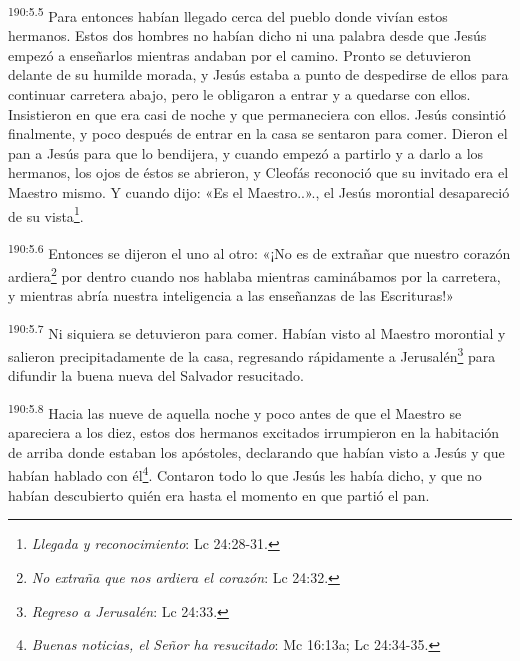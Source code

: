 \par
\textsuperscript{190:5.5} Para entonces habían llegado cerca del pueblo donde vivían estos hermanos. Estos dos hombres no habían dicho ni una palabra desde que Jesús empezó a enseñarlos mientras andaban por el camino. Pronto se detuvieron delante de su humilde morada, y Jesús estaba a punto de despedirse de ellos para continuar carretera abajo, pero le obligaron a entrar y a quedarse con ellos. Insistieron en que era casi de noche y que permaneciera con ellos. Jesús consintió finalmente, y poco después de entrar en la casa se sentaron para comer. Dieron el pan a Jesús para que lo bendijera, y cuando empezó a partirlo y a darlo a los hermanos, los ojos de éstos se abrieron, y Cleofás reconoció que su invitado era el Maestro mismo. Y cuando dijo: «Es el Maestro..»., el Jesús morontial desapareció de su vista\footnote{\textit{Llegada y reconocimiento}: Lc 24:28-31.}.

\par
\textsuperscript{190:5.6} Entonces se dijeron el uno al otro: «¡No es de extrañar que nuestro corazón ardiera\footnote{\textit{No extraña que nos ardiera el corazón}: Lc 24:32.} por dentro cuando nos hablaba mientras caminábamos por la carretera, y mientras abría nuestra inteligencia a las enseñanzas de las Escrituras!»

\par
\textsuperscript{190:5.7} Ni siquiera se detuvieron para comer. Habían visto al Maestro morontial y salieron precipitadamente de la casa, regresando rápidamente a Jerusalén\footnote{\textit{Regreso a Jerusalén}: Lc 24:33.} para difundir la buena nueva del Salvador resucitado.

\par
\textsuperscript{190:5.8} Hacia las nueve de aquella noche y poco antes de que el Maestro se apareciera a los diez, estos dos hermanos excitados irrumpieron en la habitación de arriba donde estaban los apóstoles, declarando que habían visto a Jesús y que habían hablado con él\footnote{\textit{Buenas noticias, el Señor ha resucitado}: Mc 16:13a; Lc 24:34-35.}. Contaron todo lo que Jesús les había dicho, y que no habían descubierto quién era hasta el momento en que partió el pan.
